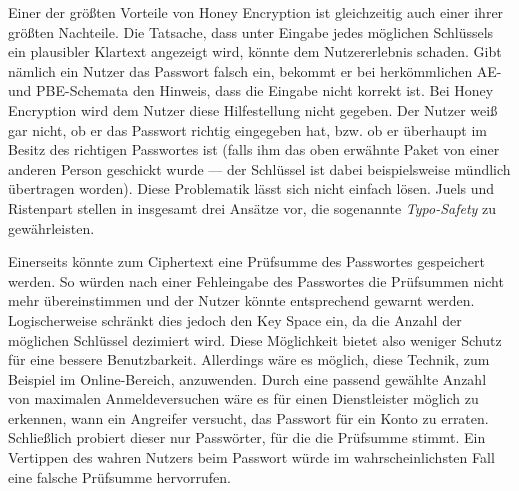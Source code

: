 
Einer der größten Vorteile von Honey Encryption ist gleichzeitig auch einer ihrer größten Nachteile. Die Tatsache, dass unter Eingabe jedes möglichen Schlüssels ein plausibler Klartext angezeigt wird, könnte dem Nutzererlebnis schaden. Gibt nämlich ein Nutzer das Passwort falsch ein, bekommt er bei herkömmlichen AE- und PBE-Schemata den Hinweis, dass die Eingabe nicht korrekt ist. Bei Honey Encryption wird dem Nutzer diese Hilfestellung nicht gegeben. Der Nutzer weiß gar nicht, ob er das Passwort richtig eingegeben hat, bzw. ob er überhaupt im Besitz des richtigen Passwortes ist (falls ihm das oben erwähnte Paket von einer anderen Person geschickt wurde --- der Schlüssel ist dabei beispielsweise mündlich übertragen worden). Diese Problematik lässt sich nicht einfach lösen. Juels und Ristenpart stellen in \cite{CRCS2014, EURO2014} insgesamt drei Ansätze vor, die sogenannte \emph{Typo-Safety} zu gewährleisten. 

Einerseits könnte zum Ciphertext eine Prüfsumme des Passwortes gespeichert werden. So würden nach einer Fehleingabe des Passwortes die Prüfsummen nicht mehr übereinstimmen und der Nutzer könnte entsprechend gewarnt werden. Logischerweise schränkt dies jedoch den Key Space ein, da die Anzahl der möglichen Schlüssel dezimiert wird. Diese Möglichkeit bietet also weniger Schutz für eine bessere Benutzbarkeit. Allerdings wäre es möglich, diese Technik, zum Beispiel im Online-Bereich, anzuwenden. Durch eine passend gewählte Anzahl von maximalen Anmeldeversuchen wäre es für einen Dienstleister möglich zu erkennen, wann ein Angreifer versucht, das Passwort für ein Konto zu erraten. Schließlich probiert dieser nur Passwörter, für die die Prüfsumme stimmt. Ein Vertippen des wahren Nutzers beim Passwort würde im wahrscheinlichsten Fall eine falsche Prüfsumme hervorrufen. 

